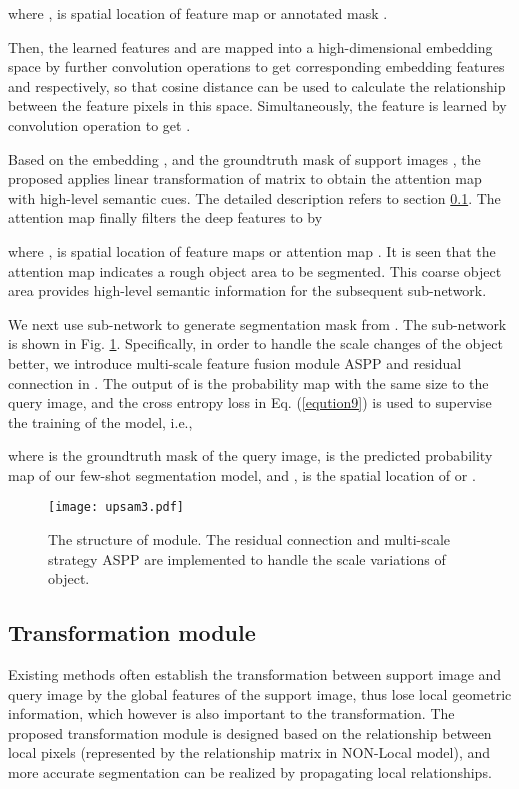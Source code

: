\documentclass[runningheads]{llncs}
\begin{document}
where ,  is spatial location of feature map  or annotated mask  .

Then, the learned features  and  are mapped into a high-dimensional embedding space by further convolution operations  to get corresponding embedding features  and  respectively, so that cosine distance can be used to calculate the relationship between the feature pixels in this space. Simultaneously, the feature  is learned by convolution operation  to get . 

Based on the embedding ,  and the groundtruth mask of support images , the proposed  applies linear transformation of matrix to obtain the attention map  with high-level semantic cues. The detailed description refers to section \ref{section_tran}.
The attention map  finally filters the deep features  to  by 

where ,  is spatial location of feature maps  or attention map . It is seen that the attention map  indicates a rough object area to be segmented. This coarse object area provides high-level semantic information for the subsequent  sub-network.

We next use  sub-network to generate segmentation mask from . The  sub-network is shown in Fig. \ref{fig3}. Specifically, in order to handle the scale changes of the object better, we introduce multi-scale feature fusion module ASPP\cite{ref_crfv1} and residual connection \cite{ref_resnet} in . The output of  is the probability map  with the same size to the query image, and the cross entropy loss in Eq. (\ref{eqution9}) is used to supervise the training of the model, i.e.,


where  is the groundtruth mask of the query image,  is the predicted probability map of our few-shot segmentation model, and ,  is the spatial location of  or .


\begin{figure}
\texttt{[image: upsam3.pdf]}
\caption{The structure of  module. The residual connection\cite{ref_resnet} and multi-scale strategy ASPP\cite{ref_crfv1} are implemented to handle the scale variations of object.} \label{fig3}
\end{figure}

\subsection{Transformation module}\label{section_tran}
Existing methods often establish the transformation between support image and query image by the global features of the support image, thus lose local geometric information, which however is also important to the transformation. The proposed transformation module is designed based on the relationship between local pixels (represented by the relationship matrix in NON-Local model\cite{ref_non_local}), and more accurate segmentation can be realized by propagating local relationships. 
\end{document}
